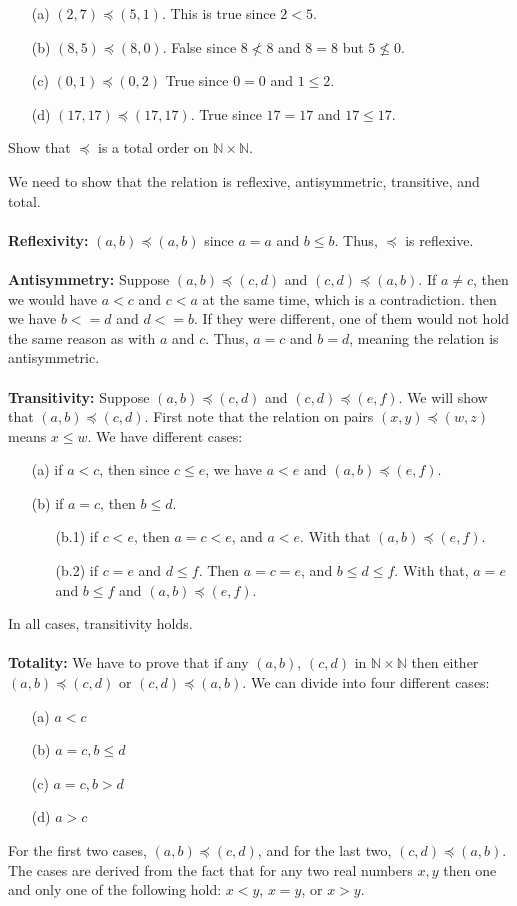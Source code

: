 \documentclass{article}
\begin{document}
\begin{enumerate}
    \item[(a)] $(2,7) \preceq (5,1)$. This is true since $2<5$.
    \item[(b)] $(8,5) \preceq (8,0)$. False since $8\not<8$ and $8=8$ but $5 \not\leq 0$.
    \item[(c)] $(0,1) \preceq (0,2)$ True since $0=0$ and $1\leq2$.
    \item[(d)] $(17,17) \preceq (17,17)$. True since $17=17$ and $17\leq17$.
\end{enumerate}

Show that $\preceq$ is a total order on $\mathbb{N} \times \mathbb{N}$.

We need to show that the relation is reflexive, antisymmetric, transitive, and total.
\\\\
\textbf{Reflexivity:} 
$(a,b) \preceq (a,b)$ since $a = a$ and $b \leq b$. Thus, $\preceq$ is reflexive.
\\\\
\textbf{Antisymmetry:} 
Suppose $(a,b) \preceq (c,d)$ and $(c,d) \preceq (a,b)$. If $a\neq c$, then we would have $a<c$ and $c<a$ at the same time, which is a contradiction. then we have $b<=d$ and $d<=b$. If they were different, one of them would not hold the same reason as with $a$ and $c$. Thus, $a=c$ and $b=d$, meaning the relation is antisymmetric.
\\\\
\textbf{Transitivity:} 
Suppose $(a,b) \preceq (c,d)$ and $(c,d) \preceq (e,f)$. We will show that $(a,b) \preceq (c,d)$. First note that the relation on pairs $(x,y)\preceq(w,z)$ means $x\leq w$. We have different cases:
\begin{enumerate}
    \item[(a)] if $a<c$, then since $c\leq e$, we have $a<e$ and $(a,b) \preceq (e,f)$.
    \item[(b)] if $a=c$, then $b\leq d$.
    \begin{enumerate}
    \item[(b.1)] if $c<e$, then $a=c<e$, and $a<e$. With that $(a,b) \preceq (e,f)$.
    \item[(b.2)] if $c=e$ and $d\leq f$. Then $a=c=e$, and $b\leq d \leq f$. With that, $a=e$ and $b\leq f$ and $(a,b) \preceq (e,f)$.
    \end{enumerate}
    
\end{enumerate}
In all cases, transitivity holds. 
\\\\
\textbf{Totality:} 
We have to prove that if any $(a,b)$, $(c,d)$ in $\mathbb{N} \times \mathbb{N}$ then either  $(a,b) \preceq (c,d)$ or $(c,d) \preceq (a,b)$. We can divide into four different cases:
\begin{enumerate}
    \item[(a)] $a < c$
    \item[(b)] $a=c, b\leq d$
    \item[(c)] $a=c, b > d$
    \item[(d)] $a>c$
\end{enumerate}

For the first two cases, $(a,b) \preceq (c,d)$, and for the last two, $(c,d) \preceq (a,b)$. The cases are derived from the fact that for any two real numbers $x,y$ then one and only one of the following hold: $x<y$, $x=y$, or $x>y$.
\end{document}
